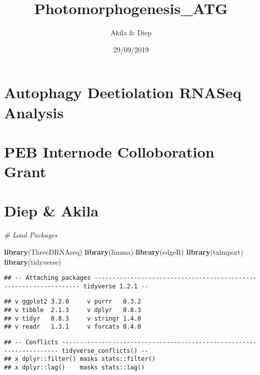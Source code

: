 \documentclass[]{article}
\title{Photomorphogenesis\_ATG}
\author{Akila \& Diep}
\date{29/09/2019}
\newenvironment{Shaded}{\begin{snugshade}}{\end{snugshade}}
\newcommand{\CommentTok}[1]{\textcolor[rgb]{0.56,0.35,0.01}{\textit{#1}}}
\newcommand{\KeywordTok}[1]{\textcolor[rgb]{0.13,0.29,0.53}{\textbf{#1}}}
\newcommand{\NormalTok}[1]{#1}
\begin{document}
\maketitle

\hypertarget{autophagy-deetiolation-rnaseq-analysis}{%
\section{Autophagy Deetiolation RNASeq
Analysis}\label{autophagy-deetiolation-rnaseq-analysis}}

\hypertarget{peb-internode-colloboration-grant}{%
\section{PEB Internode Colloboration
Grant}\label{peb-internode-colloboration-grant}}

\hypertarget{diep-akila}{%
\section{Diep \& Akila}\label{diep-akila}}

\begin{Shaded}
\begin{Highlighting}[]
\CommentTok{# Load Packages }

\KeywordTok{library}\NormalTok{(ThreeDRNAseq)}
\KeywordTok{library}\NormalTok{(limma)}
\KeywordTok{library}\NormalTok{(edgeR)}
\KeywordTok{library}\NormalTok{(tximport)}
\KeywordTok{library}\NormalTok{(tidyverse)}
\end{Highlighting}
\end{Shaded}

\begin{verbatim}
## -- Attaching packages ------------------------------------------------------------------ tidyverse 1.2.1 --
\end{verbatim}

\begin{verbatim}
## v ggplot2 3.2.0     v purrr   0.3.2
## v tibble  2.1.3     v dplyr   0.8.3
## v tidyr   0.8.3     v stringr 1.4.0
## v readr   1.3.1     v forcats 0.4.0
\end{verbatim}

\begin{verbatim}
## -- Conflicts --------------------------------------------------------------------- tidyverse_conflicts() --
## x dplyr::filter() masks stats::filter()
## x dplyr::lag()    masks stats::lag()
\end{verbatim}
\end{document}
